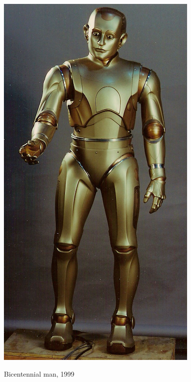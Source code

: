 \documentclass{beamer}
\begin{document}
\begin{frame}
\begin{figure}[h!]
\begin{minipage}[H]{0.20\linewidth}
				\includegraphics[width=\linewidth]{presentation_images/4}\\
				\caption{Bicentennial man, 1999}
			\end{minipage}
		\end{figure}
	\end{frame}
\end{document}

